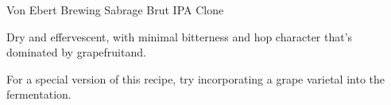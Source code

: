\begin{recipe}{Von Ebert Brewing Sabrage Brut IPA Clone}

\begin{aboutblock}
Dry and effervescent, with minimal bitterness and hop character that's dominated
by grapefruitand. \sourceaha
\end{aboutblock}


\begin{methodandtiming}
 
\begin{mashsteps}
\end{mashsteps}

\begin{fermentationsteps}
\end{fermentationsteps}

\begin{directions}
For a special version of this recipe, try incorporating a grape varietal into the
fermentation.
\end{directions}

\end{methodandtiming}

\recipebreak

\begin{ingredientsblock}

\begin{malts}
\end{malts}

\begin{hops}
\end{hops}


\end{ingredientsblock}

\end{recipe}

